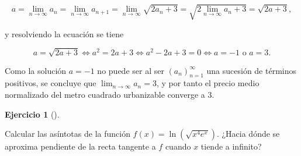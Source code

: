 \documentclass[
  a4paper,
]{scrreport}
\theoremstyle{definition}
\newtheorem{exercise}{Ejercicio}[chapter]
\theoremstyle{remark}
\begin{document}
\begin{tcolorbox}
\[
a 
= \lim_{n\to\infty} a_n 
= \lim_{n\to\infty} a_{n+1} 
= \lim_{n\to\infty} \sqrt{2a_n+3} 
= \sqrt{2\lim_{n\to\infty} a_n + 3}
= \sqrt{2a+3},
\]

y resolviendo la ecuación se tiene

\[
a = \sqrt{2a+3} 
\Leftrightarrow a^2 = 2a+3
\Leftrightarrow a^2-2a+3 = 0
\Leftrightarrow a = -1 \mbox{ o } a = 3.
\]

Como la solución \(a=-1\) no puede ser al ser \((a_n)_{n=1}^\infty\) una
sucesión de términos positivos, se concluye que
\(\lim_{n\to\infty} a_n = 3\), y por tanto el precio medio normalizado
del metro cuadrado urbanizable converge a \(3\).

\end{tcolorbox}

\begin{exercise}[]\protect\hypertarget{exr-3}{}\label{exr-3}

Calcular las asíntotas de la función \(f(x) = \ln(\sqrt{x^4e^x})\).
¿Hacia dónde se aproxima pendiente de la recta tangente a \(f\) cuando
\(x\) tiende a infinito?

\end{exercise}
\end{document}
